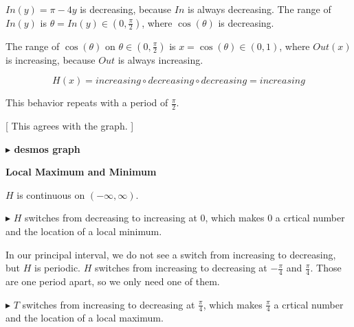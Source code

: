 \documentclass{ximera}
\begin{document}
$In(y) = \pi - 4y$ is decreasing, because $In$ is always decreasing.  The range of $In(y)$ is $\theta = In(y) \in \left(0, \frac{\pi}{2} \right)$, where $\cos(\theta)$ is decreasing. 



The range of $\cos(\theta)$ on $\theta \in \left(0, \frac{\pi}{2} \right)$ is $x = \cos(\theta) \in (0, 1)$, where $Out(x)$ is increasing, because $Out$ is always increasing. 


\[
H(x) = increasing \circ decreasing \circ decreasing = increasing
\]









This behavior repeats with a period of $\frac{\pi}{2}$. 



[ This agrees with the graph. ]





\textbf{\textcolor{blue!55!black}{$\blacktriangleright$ desmos graph}} 
\begin{center}
\end{center}



















\textbf{\textcolor{blue!55!black}{Local Maximum and Minimum}}



$H$ is continuous on $(-\infty, \infty)$.


$\blacktriangleright$ $H$ switches from decreasing to increasing at $0$, which makes $0$ a crtical number and the location of a local minimum. 



In our principal interval, we do not see a switch from increasing to decreasing, but $H$ is periodic.  $H$ switches from increasing to decreasing at $-\frac{\pi}{4}$ and $\frac{\pi}{4}$.  Those are one period apart, so we only need one of them.

$\blacktriangleright$ $T$ switches from increasing to decreasing at $\frac{\pi}{4}$, which makes $\frac{\pi}{4}$ a crtical number and the location of a local maximum. 
\end{document}
